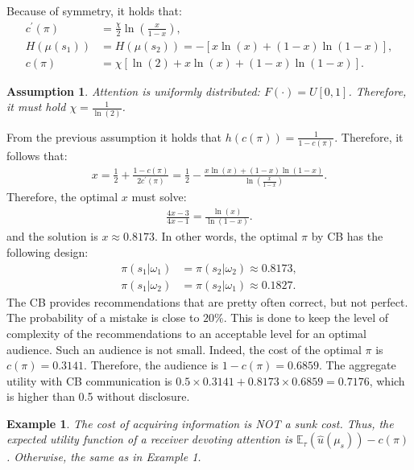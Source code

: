 \documentclass[12pt,a4paper]{article}
\newtheorem{assumption}{Assumption}
\newtheorem{example}{Example}
\begin{document}
Because of symmetry, it holds that:
\begin{align} 
    \label{cprime}
    c^\prime(\pi) & = \frac{\chi}{2}\ln\left(\frac{x}{1-x}\right), \\
    H(\mu(s_1)) & = H(\mu(s_2))=-[x\ln(x)+(1-x)\ln(1-x)], \\
    \label{c}
    c(\pi) & = \chi[\ln(2)+x\ln(x)+(1-x)\ln(1-x)].
\end{align}
\begin{assumption}
\label{Ass2}
    Attention is uniformly distributed: $F(\cdot)=U[0,1]$. Therefore, it must hold $\chi=\frac{1}{\ln(2)}$. 
\end{assumption}
From the previous assumption it holds that $h(c(\pi))=\frac{1}{1-c(\pi)}$. Therefore, it follows that:
\begin{align}
    x=\frac{1}{2}+\frac{1-c(\pi)}{2c^\prime(\pi)}=\frac{1}{2}-\frac{x\ln(x)+(1-x)\ln(1-x)}{\ln\left(\frac{x}{1-x}\right)}.
\end{align}
Therefore, the optimal $x$ must solve:
\begin{align}
    \frac{4x-3}{4x-1}=\frac{\ln(x)}{\ln(1-x)}.
\end{align}
and the solution is $x\approx 0.8173$. In other words, the optimal $\pi$ by CB has the following design:
\begin{align}
    \pi(s_1|\omega_1) & = \pi(s_2|\omega_2)\approx 0.8173, \\
    \pi(s_1|\omega_2) & = \pi(s_2|\omega_1)\approx 0.1827.
\end{align}
The CB provides recommendations that are pretty often correct, but not perfect. The probability of a mistake is close to $20\%$. This is done to keep the level of complexity of the recommendations to an acceptable level for an optimal audience. Such an audience is not small. Indeed, the cost of the optimal $\pi$ is $c(\pi)=0.3141$. Therefore, the audience is $1-c(\pi)=0.6859$. The aggregate utility with CB communication is $0.5 \times 0.3141 + 0.8173 \times  0.6859 = 0.7176$, which is higher than 0.5 without disclosure.

\begin{example}
    The cost of acquiring information is NOT a sunk cost. Thus, the expected utility function of a receiver devoting attention is $\mathbb{E}_{\tau}(\hat{u}(\mu_s))-c(\pi)$. Otherwise, the same as in Example 1.
\end{example}
\end{document}
